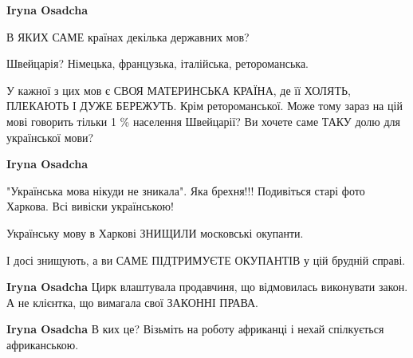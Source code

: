 \begin{itemize}
\begin{itemize}
 
\textbf{Iryna Osadcha} 

В ЯКИХ САМЕ країнах декілька державних мов?

Швейцарія? Німецька, французька, італійська, ретороманська.

У кажної з цих мов є СВОЯ МАТЕРИНСЬКА КРАЇНА, де її ХОЛЯТЬ, ПЛЕКАЮТЬ І ДУЖЕ
БЕРЕЖУТЬ. Крім ретороманської. Може тому зараз на цій мові говорить тільки 1 \%
населення Швейцарії? Ви хочете саме ТАКУ долю для української мови?


 
\textbf{Iryna Osadcha} 

"Українська мова нікуди не зникала". Яка брехня!!! Подивіться старі фото
Харкова. Всі вивіски українською!

Українську мову в Харкові ЗНИЩИЛИ московські окупанти.

І досі знищують, а ви САМЕ ПІДТРИМУЄТЕ ОКУПАНТІВ у цій брудній справі.

 
\textbf{Iryna Osadcha} Цирк влаштувала продавчиня, що відмовилась виконувати закон. А не клієнтка, що вимагала свої ЗАКОННІ ПРАВА.

 
\textbf{Iryna Osadcha} В ких це? Візьміть на роботу африканці і нехай спілкується африканською.

 

\end{itemize}
\end{itemize}
